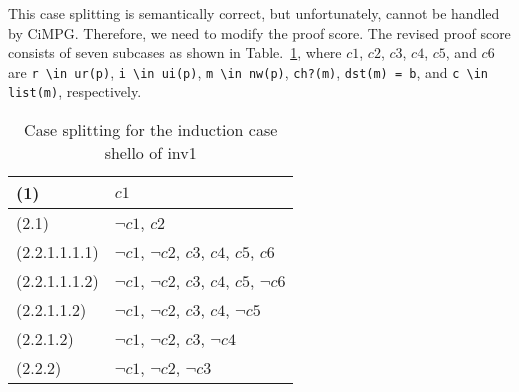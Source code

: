\documentclass[a4paper,fleqn]{cas-dc}
\begin{document}
This case splitting is semantically correct, but unfortunately, cannot be handled by CiMPG. 
Therefore, we need to modify the proof score. 
The revised proof score consists of seven subcases as shown in Table.~\ref{fig-cs-inv1}, where $c1$, $c2$, $c3$, $c4$, $c5$, and $c6$ are
 \verb!r \in ur(p)!,
 \verb!i \in ui(p)!,
 \verb!m \in nw(p)!,
 \verb!ch?(m)!,
 \verb!dst(m) = b!, and
 \verb!c \in list(m)!, respectively. 
\noindent
\begin{table}[]
	\begin{tabular}{l|l}
		\hline
		(1)           & $c1$                                                                     \\ \hline
		(2.1)         & $\neg c1$, $c2$                                                       \\ \hline
		(2.2.1.1.1.1) & $\neg c1$, $\neg c2$, $c3$, $c4$, $c5$, $c6$  \\ \hline
		(2.2.1.1.1.2) & $\neg c1$, $\neg c2$, $c3$, $c4$, $c5$, $\neg c6$ \\ \hline
		(2.2.1.1.2)   & $\neg c1$, $\neg c2$, $c3$, $c4$, $\neg c5$              \\ \hline
		(2.2.1.2)     & $\neg c1$, $\neg c2$, $c3$, $\neg c4$                           \\ \hline
		(2.2.2)       & $\neg c1$, $\neg c2$, $\neg c3$                                        \\ \hline
	\end{tabular}
\caption{Case splitting for the induction case shello of inv1}
\label{fig-cs-inv1}
\end{table}
\end{document}
